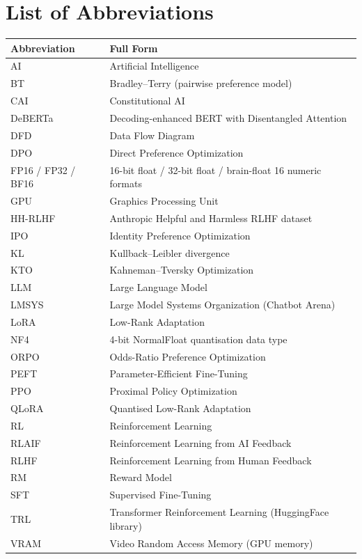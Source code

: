 \documentclass[a4paper,12pt,oneside]{report}
\begin{document}
\chapter*{List of Abbreviations}
\begin{longtable}{@{}p{3.2cm}p{11cm}@{}}
\toprule
\textbf{Abbreviation} & \textbf{Full Form}\\
\midrule\endhead
AI & Artificial Intelligence\\
BT & Bradley--Terry (pairwise preference model)\\
CAI & Constitutional AI\\
DeBERTa & Decoding-enhanced BERT with Disentangled Attention\\
DFD & Data Flow Diagram\\
DPO & Direct Preference Optimization\\
FP16 / FP32 / BF16 & 16-bit float / 32-bit float / brain-float 16 numeric formats\\
GPU & Graphics Processing Unit\\
HH-RLHF & Anthropic Helpful and Harmless RLHF dataset\\
IPO & Identity Preference Optimization\\
KL & Kullback--Leibler divergence\\
KTO & Kahneman--Tversky Optimization\\
LLM & Large Language Model\\
LMSYS & Large Model Systems Organization (Chatbot Arena)\\
LoRA & Low-Rank Adaptation\\
NF4 & 4-bit NormalFloat quantisation data type\\
ORPO & Odds-Ratio Preference Optimization\\
PEFT & Parameter-Efficient Fine-Tuning\\
PPO & Proximal Policy Optimization\\
QLoRA & Quantised Low-Rank Adaptation\\
RL & Reinforcement Learning\\
RLAIF & Reinforcement Learning from AI Feedback\\
RLHF & Reinforcement Learning from Human Feedback\\
RM & Reward Model\\
SFT & Supervised Fine-Tuning\\
TRL & Transformer Reinforcement Learning (HuggingFace library)\\
VRAM & Video Random Access Memory (GPU memory)\\
\bottomrule
\end{longtable}
\end{document}
